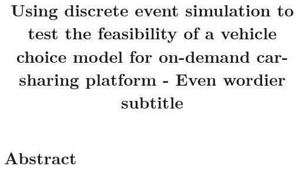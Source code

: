 \documentclass[a4paper, oneside, 12pt]{article}
\title{Using discrete event simulation to test the feasibility of a vehicle choice model for on-demand car-sharing platform - Even wordier subtitle}
\begin{document}




\clearpage
\thispagestyle{empty}
\section*{Abstract}



\clearpage
{}
\tableofcontents
\clearpage
\listoffigures
\clearpage
\listoftables
\clearpage













\appendix
\renewcommand*{\thesection}{\Alph{section}}\textbf{}




\clearpage
\renewcommand*{\thesection}{}\textbf{}



\end{document}

